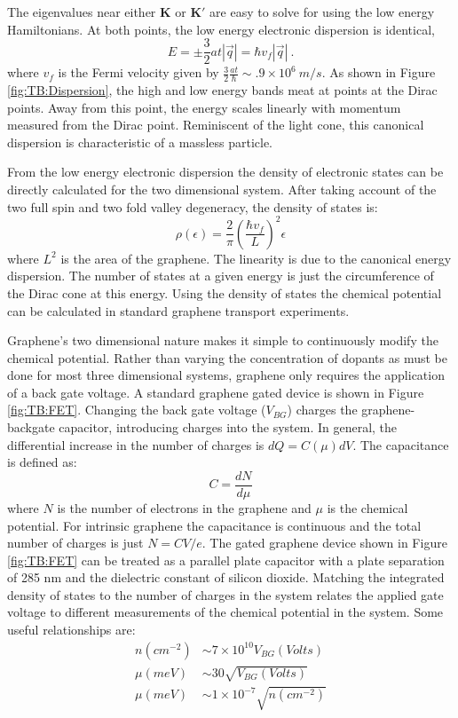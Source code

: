 The eigenvalues near either $\bm{K}$ or $\bm{K'}$ are easy to solve for using the low energy Hamiltonians.
At both points, the low energy electronic dispersion is identical,
\begin{equation*}
	E=\pm \frac{3}{2}a t |\vec{q}|=\hbar v_f |\vec{q}| \ .
\end{equation*}
where $v_f$ is the Fermi velocity given by $\frac{3}{2}\frac{at}{\hbar} \sim .9 \times 10^6 \ m/s$.
As shown in Figure \ref{fig:TB:Dispersion}, the high and low energy bands meat at points at the Dirac points.
Away from this point, the energy scales linearly with momentum measured from the Dirac point.
Reminiscent of the light cone, this canonical dispersion is characteristic of a massless particle.

From the low energy electronic dispersion the density of electronic states can be directly calculated for the two dimensional system.
After taking account of the two full spin and two fold valley degeneracy, the density of states is:
\begin{equation}
	\rho(\epsilon)=\frac{2}{\pi} \left( \frac{\hbar v_f}{L} \right)^2 \epsilon
\end{equation}
where $L^2$ is the area of the graphene.
The linearity is due to the canonical energy dispersion.
The number of states at a given energy is just the circumference of the Dirac cone at this energy.
Using the density of states the chemical potential can be calculated in standard graphene transport experiments.

Graphene's two dimensional nature makes it simple to continuously modify the chemical potential.
Rather than varying the concentration of dopants as must be done for most three dimensional systems, graphene only requires the application of a back gate voltage.
A standard graphene gated device is shown in Figure \ref{fig:TB:FET}.
Changing the back gate voltage ($V_{BG}$) charges the graphene-backgate capacitor, introducing charges into the system.
In general, the differential increase in the number of charges is $dQ=C(\mu) dV$.
The capacitance is defined as:
\begin{equation}
	C=\frac{d N}{d \mu}
\end{equation}
where $N$ is the number of electrons in the graphene and $\mu$ is the chemical potential.
For intrinsic graphene the capacitance is continuous and the total number of charges is just $N=CV/e$.
The gated graphene device shown in Figure \ref{fig:TB:FET} can be treated as a parallel plate capacitor with a plate separation of 285 nm and the dielectric constant of silicon dioxide.
Matching the integrated density of states to the number of charges in the system relates the applied gate voltage to different measurements of the chemical potential in the system.
Some useful relationships are:
\begin{align*}
	n(cm^{-2})&\sim 7 \times 10^{10} V_{BG} (Volts) \\
	\mu(meV) &\sim 30 \sqrt{V_{BG} (Volts)} \\
	\mu(meV) &\sim 1 \times 10^{-7} \sqrt{n(cm^{-2})}
\end{align*}

